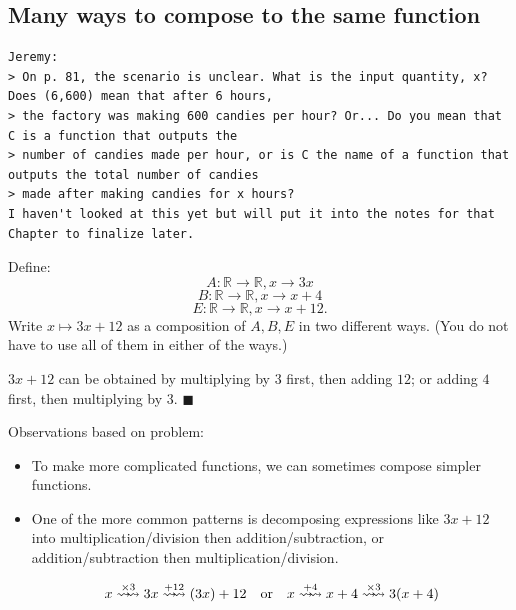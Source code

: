\documentclass[11pt]{article}
\newenvironment{task}
	{\begin{mdframed}[linecolor=lightgray, linewidth=3pt]\raggedright}
	{\end{mdframed}}
\newcommand\tn{\textnormal}
\newcommand{\R}{\mathbb{R}}
\theoremstyle{definition}
\newenvironment{solution}{{\it Solution.} }{\hfill {\color{lightgray}$\blacksquare$}}
\begin{document}
\newpage
\subsection{Many ways to compose to the same function}

\begin{verbatim} 
Jeremy:
> On p. 81, the scenario is unclear. What is the input quantity, x? Does (6,600) mean that after 6 hours, 
> the factory was making 600 candies per hour? Or... Do you mean that C is a function that outputs the 
> number of candies made per hour, or is C the name of a function that outputs the total number of candies 
> made after making candies for x hours?
I haven't looked at this yet but will put it into the notes for that Chapter to finalize later.
\end{verbatim}



\begin{task}
Define:
$$A:\R\to \R, x\to 3x$$
$$B:\R\to \R, x\to x+4$$
$$E:\R\to\R, x\to x+12.$$
Write $x\mapsto 3x+12$ as a composition of $A, B, E$ in two different ways. (You do not have to use all of them in either of the ways.)
\end{task} 

\begin{solution}
$3x+12$ can be obtained by multiplying by $3$ first, then adding $12$; or adding $4$ first, then multiplying by $3$. 
\end{solution}

Observations based on problem:

\begin{itemize}
\item To make more complicated functions, we can sometimes compose simpler functions.
\item One of the more common patterns is decomposing expressions like $3x+12$ into multiplication/division then addition/subtraction, or addition/subtraction then multiplication/division.


	$$x \stackrel{\times 3}{\rightsquigarrow\!\!\rightsquigarrow} 3x \stackrel{+12}{\rightsquigarrow\!\!\rightsquigarrow}  (3x)+12 \tn{\quad or\quad} x \stackrel{+4}{\rightsquigarrow\!\!\rightsquigarrow}  x+4 \stackrel{\times 3}{\rightsquigarrow\!\!\rightsquigarrow} 3(x+4)$$  
\end{itemize}
\end{document}
